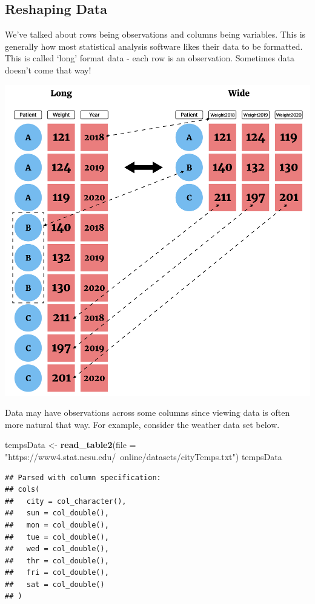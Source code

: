 \documentclass[
]{book}
\newenvironment{Shaded}{\begin{snugshade}}{\end{snugshade}}
\newcommand{\DataTypeTok}[1]{\textcolor[rgb]{0.13,0.29,0.53}{#1}}
\newcommand{\KeywordTok}[1]{\textcolor[rgb]{0.13,0.29,0.53}{\textbf{#1}}}
\newcommand{\NormalTok}[1]{#1}
\newcommand{\StringTok}[1]{\textcolor[rgb]{0.31,0.60,0.02}{#1}}
\theoremstyle{definition}
\theoremstyle{definition}
\theoremstyle{definition}
\theoremstyle{remark}
\begin{document}
\hypertarget{reshaping-data}{%
\subsection{Reshaping Data}\label{reshaping-data}}

We've talked about rows being observations and columns being variables. This is generally how most statistical analysis software likes their data to be formatted. This is called `long' format data - each row is an observation. Sometimes data doesn't come that way!

\begin{center}\includegraphics[width=0.7\linewidth]{img/longWideF} \end{center}

Data may have observations across some columns since viewing data is often more natural that way. For example, consider the weather data set below.

\begin{Shaded}
\begin{Highlighting}[]
\NormalTok{tempsData <-}\StringTok{ }\KeywordTok{read_table2}\NormalTok{(}\DataTypeTok{file =} \StringTok{"https://www4.stat.ncsu.edu/~online/datasets/cityTemps.txt"}\NormalTok{) }
\NormalTok{tempsData}
\end{Highlighting}
\end{Shaded}

\begin{verbatim}
## Parsed with column specification:
## cols(
##   city = col_character(),
##   sun = col_double(),
##   mon = col_double(),
##   tue = col_double(),
##   wed = col_double(),
##   thr = col_double(),
##   fri = col_double(),
##   sat = col_double()
## )
\end{verbatim}
\end{document}
